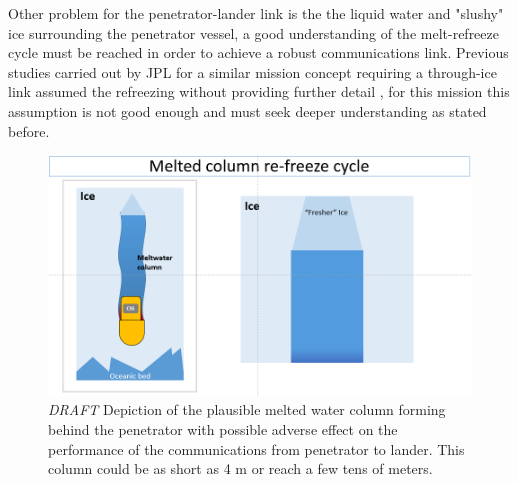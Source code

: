 Other problem for the penetrator-lander link is the the liquid water and "slushy" ice surrounding the penetrator vessel, a good understanding of the melt-refreeze cycle must be reached in order to achieve a robust communications link. Previous studies carried out by JPL for a similar mission concept requiring a through-ice link assumed the refreezing without providing further detail \cite{iceLink-scott}, for this mission this assumption is not good enough and must seek deeper understanding as stated before. 

\begin{figure}[htb]
	\centering
	\includegraphics[width=\textwidth]{figures/comms/meltColCycle_0}
	\caption{ \textit{DRAFT} Depiction of the plausible melted water column forming behind the penetrator with possible adverse effect on the performance of the communications from penetrator to lander. This column could be as short as 4 m or reach a few tens of meters.}
	\label{fig:meltColumn_broad}
\end{figure}
